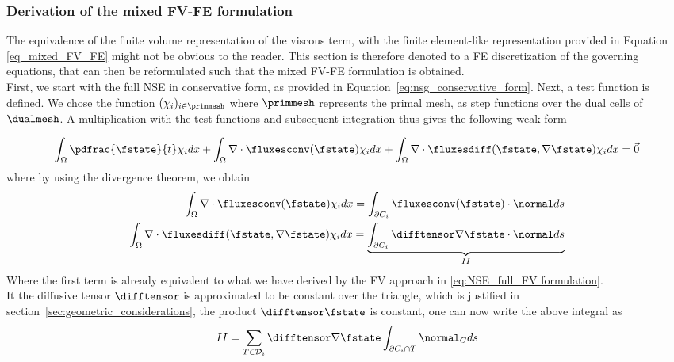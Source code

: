 \documentclass[../main.tex]{subfiles}
\begin{document}
\cleardoublepage
\subsubsection{Derivation of the mixed \ac{FV}-\ac{FE} formulation}\label{sec:viscous_term_treatment}
The equivalence of the finite volume representation of the viscous term, with the finite element-like representation provided in Equation \eqref{eq_mixed_FV_FE} might not be obvious to the reader. This section is therefore denoted to a \ac{FE} discretization of the governing equations, that can then be reformulated such that the mixed \ac{FV}-\ac{FE} formulation is obtained.\\
First, we start with the full \ac{NSE} in conservative form, as provided in Equation~\eqref{eq:nsg_conservative_form}. Next, a test function is defined. We chose the function $({\chi_i})_{i\in \primmesh}$ where $\primmesh$ represents the primal mesh, as step functions over the dual cells of $\dualmesh$.
A multiplication with the test-functions and subsequent integration thus gives the following weak form

\begin{align}\label{fv_weak_form_felike}
  \int_\Omega \pdfrac{\fstate}{t}\chi_i dx + \int_\Omega \nabla \cdot \fluxesconv(\fstate)\chi_i dx + \int_\Omega \nabla \cdot \fluxesdiff(\fstate,\nabla  \fstate)\chi_i dx = \vec{0}
\end{align}
where by using the divergence theorem, we obtain
\begin{align}\label{eq:divtheorem_felike}
  \int_\Omega \nabla \cdot \fluxesconv(\fstate)\chi_i dx = \int_{\partial C_i} \fluxesconv(\fstate)\cdot \normal ds \nonumber\\
  \int_\Omega \nabla \cdot \fluxesdiff(\fstate,\nabla \fstate)\chi_i dx = \underbrace{\int_{\partial C_i} \difftensor \nabla\fstate\cdot \normal ds}_{II}
\end{align}
Where the first term is already equivalent to what we have derived by the \ac{FV} approach in \eqref{eq:NSE_full_FV formulation}.\\



It the diffusive tensor $\difftensor$ is approximated to be constant over the triangle, which is justified in section~\ref{sec:geometric_considerations}, the product $\difftensor\fstate$ is constant, one can now write the above integral as
\begin{align}
II=\sum_{T \in \mathcal{D}_i} \difftensor \nabla\fstate\int_{\partial C_i \cap T} \normal_C ds
\end{align}
\end{document}
